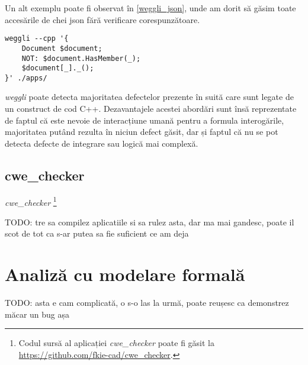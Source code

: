 Un alt exemplu poate fi observat în \ref{weggli_json}, unde am dorit să găsim toate accesările de chei \acrshort{json} fără verificare corespunzătoare.

\begin{lstlisting}[label={weggli_json}, caption={Interogare weggli pentru a găsi accesarea de chei JSON fără verificare}]
weggli --cpp '{ 
    Document $document;
    NOT: $document.HasMember(_);
    $document[_]._();
}' ./apps/
\end{lstlisting}

\textit{weggli} poate detecta majoritatea defectelor prezente în suită care sunt legate de un construct de cod C++. Dezavantajele acestei abordări sunt însă reprezentate de faptul că este nevoie de interacțiune umană pentru a formula interogările, majoritatea putând rezulta în niciun defect găsit, dar și faptul că nu se pot detecta defecte de integrare sau logică mai complexă.

\subsection{cwe\_checker} 

\textit{cwe\_checker} \footnote{Codul sursă al aplicației \textit{cwe\_checker} poate fi găsit la \url{https://github.com/fkie-cad/cwe_checker}.}

TODO: tre sa compilez aplicatiile si sa rulez asta, dar ma mai gandesc, poate il scot de tot ca s-ar putea sa fie suficient ce am deja

\section{Analiză cu modelare formală}

TODO: asta e cam complicată, o s-o las la urmă, poate reușesc ca demonstrez măcar un bug așa

